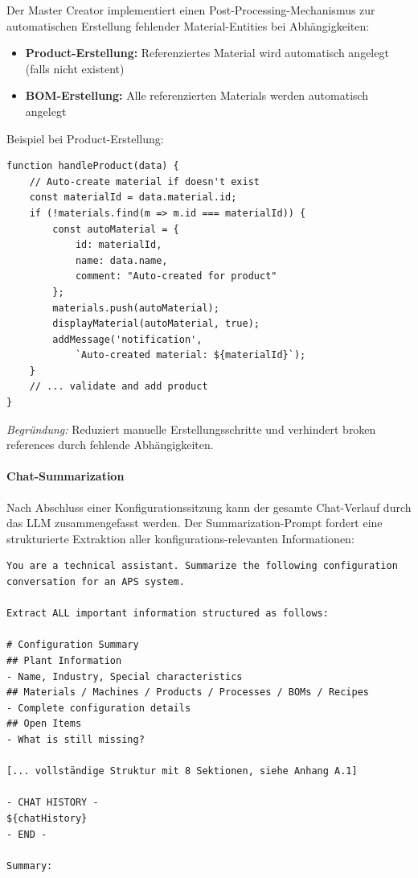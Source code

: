 Der Master Creator implementiert einen Post-Processing-Mechanismus zur automatischen Erstellung fehlender Material-Entities bei Abhängigkeiten:

\begin{itemize}
    \item \textbf{Product-Erstellung:} Referenziertes Material wird automatisch angelegt (falls nicht existent)
    \item \textbf{BOM-Erstellung:} Alle referenzierten Materials werden automatisch angelegt
\end{itemize}

\noindent Beispiel bei Product-Erstellung:

\begin{verbatim}
function handleProduct(data) {
    // Auto-create material if doesn't exist
    const materialId = data.material.id;
    if (!materials.find(m => m.id === materialId)) {
        const autoMaterial = {
            id: materialId,
            name: data.name,
            comment: "Auto-created for product"
        };
        materials.push(autoMaterial);
        displayMaterial(autoMaterial, true);
        addMessage('notification',
            `Auto-created material: ${materialId}`);
    }
    // ... validate and add product
}
\end{verbatim}

\noindent \textit{Begründung:} Reduziert manuelle Erstellungsschritte und verhindert broken references durch fehlende Abhängigkeiten.

\paragraph{Chat-Summarization}

Nach Abschluss einer Konfigurationssitzung kann der gesamte Chat-Verlauf durch das LLM zusammengefasst werden. Der Summarization-Prompt fordert eine strukturierte Extraktion aller konfigurations-relevanten Informationen:

\begin{verbatim}
You are a technical assistant. Summarize the following configuration
conversation for an APS system.

Extract ALL important information structured as follows:

# Configuration Summary
## Plant Information
- Name, Industry, Special characteristics
## Materials / Machines / Products / Processes / BOMs / Recipes
- Complete configuration details
## Open Items
- What is still missing?

[... vollständige Struktur mit 8 Sektionen, siehe Anhang A.1]

- CHAT HISTORY -
${chatHistory}
- END -

Summary:
\end{verbatim}

